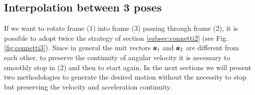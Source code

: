 

\subsection{Interpolation between 3 poses}
\label{subsec:connetti3}
If we want to rotate frame (1) into frame (3) passing through frame (2), it is possible to adopt twice the strategy of section \ref{subsec:connetti2} (see Fig. \ref{fig:connetti3}). Since in general the unit vectors ${\boldsymbol{u}}_1$ and ${\boldsymbol{u}}_2$ are different from each other, to preserve the continuity of angular velocity it is necessary to smoothly stop in (2) and then to start again. In the next sections we will present two methodologies to generate the desired motion without the necessity to stop but preserving the velocity and acceleration continuity.

